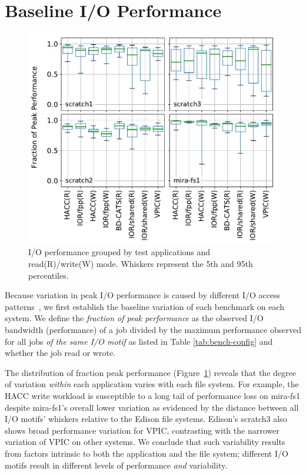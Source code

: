 \section{Baseline I/O Performance} \label{sec:results}

\begin{figure}[t]
    \centering
    \includegraphics[width=1.0\columnwidth]{figs/perf-boxplots.pdf}
    \vspace{-.35in}
    \caption{I/O performance grouped by test applications and read(R)/write(W) mode.  Whiskers represent the 5th and 95th percentiles.}
    \label{fig:perf-summary-boxplots-motif}
    \vspace{-.3in}
\end{figure}

Because variation in peak I/O performance is caused by different I/O access patterns~\cite{Lofstead2010,Uselton2010,Xie2012}, we first establish the baseline variation of each benchmark on each system.
We define the \emph{fraction of peak performance} as the observed I/O bandwidth (performance) of a job divided by the maximum performance observed for all jobs \emph{of the same I/O motif} as listed in Table \ref{tab:bench-config} and whether the job read or wrote.

The distribution of fraction peak performance (Figure~\ref{fig:perf-summary-boxplots-motif})
reveals that the degree of variation \emph{within} each application varies with each file system.
For example, the HACC write workload is susceptible to a long tail of performance loss on mira-fs1 despite mira-fs1's overall lower variation as evidenced by the distance between all I/O motifs' whiskers relative to the Edison file systems.
Edison's scratch3 also shows broad performance variation for VPIC, contrasting with the narrower variation of VPIC on other systems.  We conclude that such variability results from factors intrinsic to both the application and the file system;
different I/O motifs result in different levels of performance \emph{and} variability.

